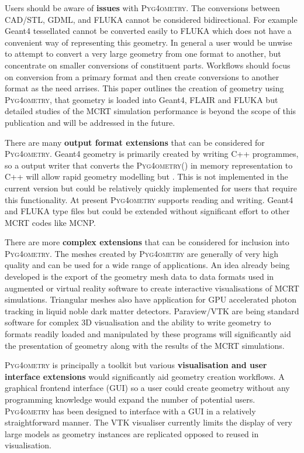 \documentclass[final,5p,times,twocolumn]{elsarticle}
\newcommand{\PYGEOMETRY}{\textsc{Pyg4ometry}}
\begin{document}
Users should be aware of {\bf issues} with \PYGEOMETRY{}. The conversions between CAD/STL, GDML, and FLUKA 
cannot be considered bidirectional. For example Geant4 tessellated cannot be converted easily to FLUKA which does not 
have a convenient way of representing this geometry. In general a user would be unwise to attempt to convert a very large 
geometry from one format to another, but concentrate on smaller conversions of constituent parts. Workflows should focus 
on conversion from a primary format and then create conversions to another format as the need arrises. This paper outlines 
the creation of geometry using \PYGEOMETRY{}, that geometry is loaded into Geant4, FLAIR and FLUKA but detailed 
studies of the MCRT simulation performance is beyond the scope of this publication and will be addressed in the future.

There are many {\bf output format extensions} that can be considered for \PYGEOMETRY{}. 
Geant4 geometry is primarily created by writing C++ programmes, so a output writer that 
converts the \PYGEOMETRY() in memory representation to C++ will allow rapid geometry 
modelling but . This is not implemented in the current version but could be relatively quickly implemented
for users that require this functionality. At present \PYGEOMETRY{} supports reading and writing. 
Geant4 and FLUKA type files but could be extended without significant effort to other MCRT codes 
like MCNP. 

There are more {\bf complex extensions} that can be considered for inclusion into \PYGEOMETRY{}.
The meshes created by \PYGEOMETRY{} are generally of very high quality and can be used for a 
wide range of applications. An idea already being developed is the export of the geometry mesh data to
data formats used in augmented or virtual reality software to create interactive visualisations of MCRT 
simulations.  Triangular meshes also have application  for GPU accelerated photon tracking in 
liquid noble dark matter detectors. Paraview/VTK are being standard software for complex 3D visualisation and 
the ability to write geometry to formats readily loaded and manipulated by these programs will 
significantly aid the presentation of geometry along with the results of the MCRT simulations.

\PYGEOMETRY{} is principally a toolkit but various {\bf visualisation and user interface extensions} would 
significantly aid geometry creation workflows. A graphical frontend interface (GUI) so a user could create 
geometry without any programming knowledge would expand the number of potential users. \PYGEOMETRY{}
has been designed to interface with a GUI in a relatively straightforward manner. The VTK visualiser currently 
limits the display of very large models as geometry instances are replicated opposed to reused in visualisation. 
\end{document}

